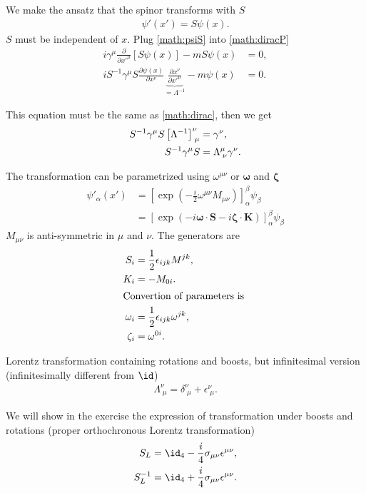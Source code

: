 We make the ansatz that the spinor transforms with $S$ 
\begin{align}
   \psi'(x') = S\psi(x). \label{math:psiS}
\end{align}
$S$ must be independent of $x$. Plug \ref{math:psiS} into \ref{math:diracP} 
\begin{align*}
   i \gamma^\mu \frac{\partial}{\partial x'^\mu} \left[ S \psi(x) \right] - m S \psi(x) &= 0, \\
   i S^{-1} \gamma^\mu S \frac{\partial \psi (x)}{\partial x^\nu} \underbrace{\frac{\partial x^\nu}{\partial x'^\mu}}_{=\Lambda^{-1}} - m\psi(x)  &= 0.
\end{align*}

This equation must be the same as \ref{math:dirac}, then we get
\begin{align}
   S^{-1} \gamma^\mu S \left[ \Lambda^{-1} \right]^\nu_{\; \mu} &= \gamma^\nu, \notag\\
   S^{-1} \gamma^\mu S &= \Lambda^\mu_{\; \nu} \gamma^\nu. \label{math:SDef}
\end{align}

The transformation can be parametrized using $\omega^{\mu\nu}$ or $\pmb \omega$ and $\pmb \zeta$
\begin{align}
   \psi'_\alpha(x') &= \left[\exp(-\frac{i}{2} \omega^{\mu\nu} M_{\mu\nu})\right]^\beta_\alpha \psi_\beta \\
                    &= \left[   \exp(-i \pmb \omega \cdot \pmb S - i \pmb \zeta \cdot \pmb K) \right]_\alpha^\beta \psi_\beta
\end{align}
$M_{\mu\nu}$ is anti-symmetric in $\mu$ and $\nu$. The generators are
\begin{align*}
   S_i &= \frac{1}{2} \epsilon_{ijk} M^{jk}, \\
   K_i &= -M_{0i}. \\
   \shortintertext{Convertion of parameters is }
   \omega_i &= \frac{1}{2} \epsilon_{ijk} \omega^{jk}, \\
   \zeta_i &= \omega^{0i}.
\end{align*}

Lorentz transformation containing rotations and boosts, but infinitesimal version (infinitesimally different from $\id$)
\begin{align}
   \Lambda^\nu_{\; \mu} = \delta^\nu_{\;\mu} + \epsilon^\nu_{\;\mu}.
\end{align}

We will show in the exercise the expression of transformation under boosts and rotations (proper orthochronous Lorentz transformation)
\begin{align*}
   S_L &= \id_4 - \frac{i}{4} \sigma_{\mu\nu} \epsilon^{\mu\nu}, \\
   S_L^{-1} &= \id_4 + \frac{i}{4} \sigma_{\mu\nu} \epsilon^{\mu\nu}.
\end{align*}

